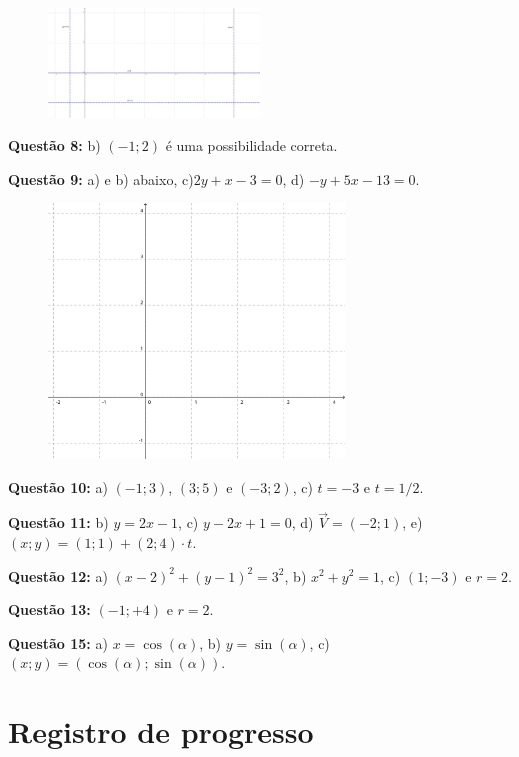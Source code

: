 \documentclass[main_estudante.tex]{subfiles}
\begin{document}
\begin{figure}[h]
\centering
\includegraphics[width=0.5\textwidth]{./img/c6g7.png}
\end{figure}

\noindent\textbf{Questão 8:} b) $(-1;2)$ é uma possibilidade correta.

\noindent\textbf{Questão 9:} a) e b) abaixo, c)$2y+x-3=0$, d) $-y+5x-13=0$.

\begin{figure}[h]
\centering
\includegraphics[width=0.7\textwidth]{./img/c6q9.png}
\end{figure}

\noindent\textbf{Questão 10:} a) $(-1;3)$, $(3;5)$ e $(-3;2)$, c) $t=-3$ e $t=1/2$.

\noindent\textbf{Questão 11:} b) $y=2x-1$, c) $y-2x+1=0$, d) $\overrightarrow{V}=(-2;1)$, e) $(x;y)=(1;1)+(2;4) \cdot t$.

\noindent\textbf{Questão 12:} a) $(x-2)^2+(y-1)^2=3^2$, b) $x^2+y^2=1$, c) $(1;-3)$ e $r=2$.

\noindent\textbf{Questão 13:} $(-1;+4)$ e $r=2$.

\noindent\textbf{Questão 15:} a) $x=\cos(\alpha)$, b) $y=\sin(\alpha)$,  c) $(x;y)=(\cos(\alpha);\sin(\alpha))$.

\newpage

\section{Registro de progresso}
\end{document}
